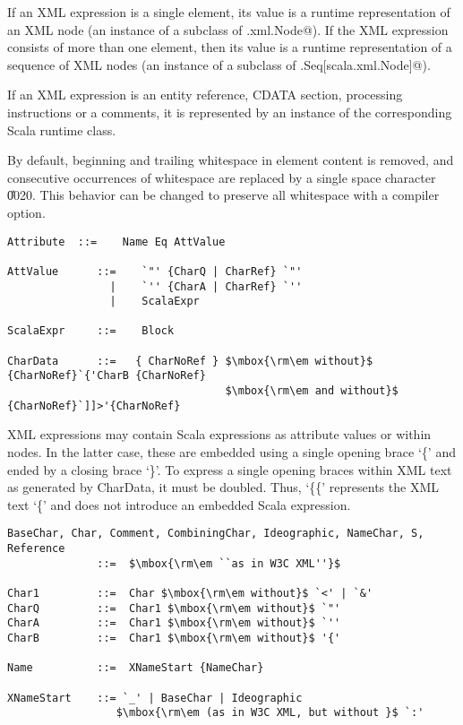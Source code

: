 If an XML expression is a single element, its value is a runtime
representation of an XML node (an instance of a subclass of 
\lstinline@scala.xml.Node@). If the XML expression consists of more
than one element, then its value is a runtime representation of a
sequence of XML nodes (an instance of a subclass of 
\lstinline@scala.Seq[scala.xml.Node]@).

If an XML expression is an entity reference, CDATA section, processing 
instructions or a comments, it is represented by an instance of the 
corresponding Scala runtime class.

By default, beginning and trailing whitespace in element content is removed, 
and consecutive occurrences of whitespace are replaced by a single space
character \U{0020}. This behavior can be changed to preserve all whitespace
with a compiler option.

\syntax\begin{lstlisting}
Attribute  ::=    Name Eq AttValue                                    

AttValue      ::=    `"' {CharQ | CharRef} `"'
                |    `'' {CharA | CharRef} `''
                |    ScalaExpr

ScalaExpr     ::=    Block

CharData      ::=   { CharNoRef } $\mbox{\rm\em without}$ {CharNoRef}`{'CharB {CharNoRef} 
                                  $\mbox{\rm\em and without}$ {CharNoRef}`]]>'{CharNoRef}
\end{lstlisting}
XML expressions may contain Scala expressions as attribute values or
within nodes. In the latter case, these are embedded using a single opening 
brace `\{' and ended by a closing brace `\}'. To express a single opening braces 
within XML text as generated by CharData, it must be doubled. Thus, `\{\{'
represents the XML text `\{' and does not introduce an embedded Scala
expression.

\syntax\begin{lstlisting}
BaseChar, Char, Comment, CombiningChar, Ideographic, NameChar, S, Reference
              ::=  $\mbox{\rm\em ``as in W3C XML''}$

Char1         ::=  Char $\mbox{\rm\em without}$ `<' | `&'
CharQ         ::=  Char1 $\mbox{\rm\em without}$ `"'
CharA         ::=  Char1 $\mbox{\rm\em without}$ `''
CharB         ::=  Char1 $\mbox{\rm\em without}$ '{'

Name          ::=  XNameStart {NameChar}

XNameStart    ::= `_' | BaseChar | Ideographic 
                 $\mbox{\rm\em (as in W3C XML, but without }$ `:'

\end{lstlisting}

